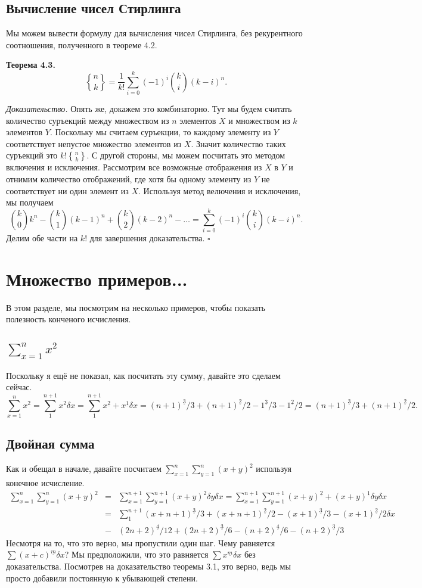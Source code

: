 \documentclass{article}
\newcommand{\ff}[1]{%
  ^{\underline{#1}}%
}
\DeclareRobustCommand{\stirling}{\genfrac\{\}{0pt}{}}
\begin{document}
\subsection{Вычисление чисел Стирлинга}
Мы можем вывести формулу для вычисления чисел Стирлинга, без рекурентного соотношения, полученного в теореме 4.2.

\textbf{Теорема 4.3.}
$$\stirling{n}{k}=\frac{1}{k!} \sum_{i=0}^k (-1)^i \binom{k}{i} (k-i)^n.$$

\textit{Доказательство.} Опять же, докажем это комбинаторно.
Тут мы будем считать количество суръекций между множеством из $n$ элементов $X$ и множеством из $k$ элементов $Y$.
Поскольку мы считаем суръекции, то каждому элементу из $Y$ соответствует непустое множество элементов из $X$. Значит количество таких суръекций это $k!\stirling{n}{k}$.
С другой стороны, мы можем посчитать это методом включения и исключения. Рассмотрим все возможные отображения из $X$ в $Y$ и отнимим количество отображений, где хотя бы одному элементу из $Y$ не соответствует ни один элемент из $X$. Используя метод велючения и исключения, мы получаем
$$\binom{k}{0}k^n-\binom{k}{1}(k-1)^n+\binom{k}{2}(k-2)^n-\dots=\sum_{i=0}^k (-1)^i \binom{k}{i} (k-i)^n.$$
Делим обе части на $k!$ для завершения доказательства. $\square$
\section{Множество примеров...}
В этом разделе, мы посмотрим на несколько примеров, чтобы показать полезность конченого исчисления.
\subsection{$\sum_{x=1}^n x^2$}
Поскольку я ещё не показал, как посчитать эту сумму, давайте это сделаем сейчас.
$$\sum_{x=1}^n x^2=\sum_1^{n+1}x^2 \delta x=\sum_1^{n+1} x\ff{2}+x\ff{1} \delta x=(n+1)\ff{3}/3+(n+1)\ff{2}/2-1\ff{3}/3-1\ff{2}/2=(n+1)\ff{3}/3+(n+1)\ff{2}/2.$$
\subsection{Двойная сумма}
Как и обещал в начале, давайте посчитаем $\sum_{x=1}^n \sum_{y=1}^n (x+y)^2$ используя конечное исчисление.
\begin{eqnarray*}
\sum_{x=1}^n \sum_{y=1}^n (x+y)^2 &=& \sum_{x=1}^{n+1} \sum_{y=1}^{n+1} (x+y)^2 \delta y \delta x=\sum_{x=1}^{n+1} \sum_{y=1}^{n+1} (x+y)\ff{2}+(x+y)\ff{1} \delta y \delta x \\
&=& \sum_1^{n+1} (x+n+1)\ff{3}/3+(x+n+1)\ff{2}/2-(x+1)\ff{3}/3-(x+1)\ff{2}/2 \delta x \\
&-& (2n+2)\ff{4}/12+(2n+2)\ff{3}/6-(n+2)\ff{4}/6-(n+2)\ff{3}/3
\end{eqnarray*}
Несмотря на то, что это верно, мы пропустили один шаг. Чему равняется $\sum(x+c)\ff{m} \delta x$? Мы предположили, что это равняется $\sum x\ff{m} \delta x$ без доказательства. Посмотрев на доказательство теоремы 3.1, это верно, ведь мы просто добавили постоянную к убывающей степени.
\end{document}
